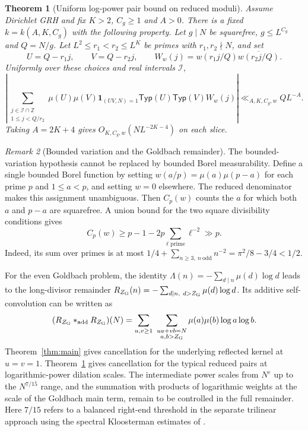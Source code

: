 \documentclass[11pt]{amsart}
\numberwithin{equation}{section}
\newtheorem{theorem}{Theorem}[section]
\theoremstyle{remark}
\newtheorem{remark}[theorem]{Remark}
\newcommand{\Z}{\mathbb Z}
\newcommand{\one}{\mathbf 1}
\newcommand{\Typ}{\mathsf{Typ}}
\begin{document}
\begin{theorem}[Uniform log-power pair bound on reduced moduli]\label{thm:pair}
Assume Dirichlet GRH and fix $K>2$, $C_g\ge1$ and $A>0$. There is a fixed $k=k(A,K,C_g)$ with the following property. Let $g\mid N$ be squarefree, $g\le L^{C_g}$ and $Q=N/g$. Let $L^2\le r_1<r_2\le L^K$ be primes with $r_1,r_2\nmid N$, and set
\[
 U=Q-r_1j,\qquad V=Q-r_2j,\qquad
 W_w(j)=w(r_1j/Q)\overline{w(r_2j/Q)}.
\]
Uniformly over these choices and real intervals $\mathcal I$,
\begin{equation}\label{eq:pair}
 \left|\sum_{\substack{j\in\mathcal I\cap\Z\\1\le j<Q/r_2}}
 \mu(U)\mu(V)\one_{(UV,N)=1}\Typ(U)\Typ(V)W_w(j)\right|
 \ll_{A,K,C_g,w} QL^{-A}.
\end{equation}
Taking $A=2K+4$ gives $O_{K,C_g,w}(NL^{-2K-4})$ on each slice.
\end{theorem}

\begin{remark}[Bounded variation and the Goldbach remainder]\label{rem:scope}
The bounded-variation hypothesis cannot be replaced by bounded Borel measurability. Define a single bounded Borel function by setting $w(a/p)=\mu(a)\mu(p-a)$ for each prime $p$ and $1\le a<p$, and setting $w=0$ elsewhere. The reduced denominator makes this assignment unambiguous. Then $C_p(w)$ counts the $a$ for which both $a$ and $p-a$ are squarefree. A union bound for the two square divisibility conditions gives
\[
 C_p(w)\ge p-1-2p\sum_{\ell\text{ prime}}\ell^{-2}\gg p.
\]
Indeed, its sum over primes is at most $1/4+\sum_{n\ge3,\ n\ \mathrm{odd}}n^{-2}=\pi^2/8-3/4<1/2$.

For the even Goldbach problem, the identity $\Lambda(n)=-\sum_{d\mid n}\mu(d)\log d$ leads to the long-divisor remainder $R_{Z_{\rm G}}(n)=-\sum_{d\mid n,\ d>Z_{\rm G}}\mu(d)\log d$. Its additive self-convolution can be written as
\[
 (R_{Z_{\rm G}}*_{\rm add} R_{Z_{\rm G}})(N)=
 \sum_{u,v\ge1}\ \sum_{\substack{ua+vb=N\\a,b>Z_{\rm G}}}
 \mu(a)\mu(b)\log a\log b.
\]
Theorem~\ref{thm:main} gives cancellation for the underlying reflected kernel at $u=v=1$. Theorem~\ref{thm:pair} gives cancellation for the typical reduced pairs at logarithmic-power dilation scales. The intermediate power scales from $N^\varepsilon$ up to the $N^{7/15}$ range, and the summation with products of logarithmic weights at the scale of the Goldbach main term, remain to be controlled in the full remainder. Here $7/15$ refers to a balanced right-end threshold in the separate trilinear approach using the spectral Kloosterman estimates of \cite[Corollary~5.5]{Pascadi}.
\end{remark}
\end{document}
